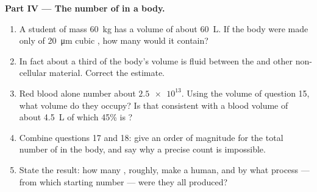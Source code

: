 \begin{problem}
\medskip
\noindent\textbf{Part IV --- The number of  in a body.}
\begin{enumerate}[resume]
  \item A student of mass \qty{60}{kg} has a volume of about
        \qty{60}{L}. If the body were made only of \qty{20}{\micro m}
        cubic , how many would it contain?
  \item In fact about a third of the body's volume is fluid between the
         and other non-cellular material. Correct the estimate.
  \item Red blood  alone number about $\num{2.5e13}$. Using the
        volume of question 15, what volume do they occupy? Is that
        consistent with a blood volume of about \qty{4.5}{L} of which
        45\% is ?
  \item Combine questions 17 and 18: give an order of magnitude for the
        total number of  in the body, and say why a precise count
        is impossible.
  \item State the result: how many , roughly, make a human, and
        by what process --- from which starting number --- were they all
        produced?
\end{enumerate}
\end{problem}

